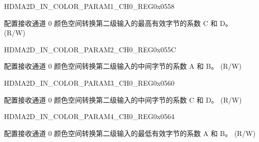 \begin{register}{H}{DMA2D\_IN\_COLOR\_PARAM1\_CH0\_REG}{0x0558}\label{regdesc:DMA2DINCOLORPARAM1CH0REG}
%
%
\regnewline%
\begin{regdesc}\begin{reglist}
\label{fielddesc:DMA2DINCOLORPARAMH1CH0}\item [DMA2D\_IN\_COLOR\_PARAM\_H1\_CH0] 配置接收通道 0 颜色空间转换第二级输入的最高有效字节的系数 C 和 D。 (R/W)
\end{reglist}\end{regdesc}
\end{register}


\begin{register}{H}{DMA2D\_IN\_COLOR\_PARAM2\_CH0\_REG}{0x055C}\label{regdesc:DMA2DINCOLORPARAM2CH0REG}
%
%
\regnewline%
\begin{regdesc}\begin{reglist}
\label{fielddesc:DMA2DINCOLORPARAMM0CH0}\item [DMA2D\_IN\_COLOR\_PARAM\_M0\_CH0] 配置接收通道 0 颜色空间转换第二级输入的中间字节的系数 A 和 B。 (R/W)
\end{reglist}\end{regdesc}
\end{register}


\begin{register}{H}{DMA2D\_IN\_COLOR\_PARAM3\_CH0\_REG}{0x0560}\label{regdesc:DMA2DINCOLORPARAM3CH0REG}
%
%
\regnewline%
\begin{regdesc}\begin{reglist}
\label{fielddesc:DMA2DINCOLORPARAMM1CH0}\item [DMA2D\_IN\_COLOR\_PARAM\_M1\_CH0] 配置接收通道 0 颜色空间转换第二级输入的中间字节的系数 C 和 D。 (R/W)
\end{reglist}\end{regdesc}
\end{register}


\begin{register}{H}{DMA2D\_IN\_COLOR\_PARAM4\_CH0\_REG}{0x0564}\label{regdesc:DMA2DINCOLORPARAM4CH0REG}
%
%
\regnewline%
\begin{regdesc}\begin{reglist}
\label{fielddesc:DMA2DINCOLORPARAML0CH0}\item [DMA2D\_IN\_COLOR\_PARAM\_L0\_CH0] 配置接收通道 0 颜色空间转换第二级输入的最低有效字节的系数 A 和 B。 (R/W)
\end{reglist}\end{regdesc}
\end{register}


